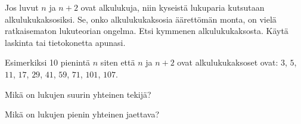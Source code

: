 \begin{kotitehtavasivu}
\begin{tehtava}
    Jos luvut $n$ ja $n + 2$ ovat alkulukuja, niin kyseistä lukuparia kutsutaan alkulukukaksosiksi. Se, onko alkulukukaksosia äärettömän monta, on vielä ratkaisematon lukuteorian ongelma. Etsi kymmenen alkulukukaksosta. Käytä laskinta tai tietokonetta apunasi.
    
    \begin{vastaus}
        Esimerkiksi 10 pienintä $n$ siten että $n$ ja $n + 2$ ovat alkulukukaksoset ovat: $3$, $5$, $11$, $17$, $29$, $41$, $59$, $71$, $101$, $107$.
    \end{vastaus}
    
\end{tehtava}

\begin{tehtava}
    Mikä on lukujen suurin yhteinen tekijä?
    \begin{alakohdat}
    \end{alakohdat}

    \begin{vastaus}
        \begin{alakohdat}
        \end{alakohdat}
    \end{vastaus}
    
\end{tehtava}

\begin{tehtava}
    Mikä on lukujen pienin yhteinen jaettava?
    
    \begin{alakohdat}
    \end{alakohdat}

    \begin{vastaus}
    
        \begin{alakohdat}
        \end{alakohdat}
    \end{vastaus}
    

\end{tehtava}
\end{kotitehtavasivu}
